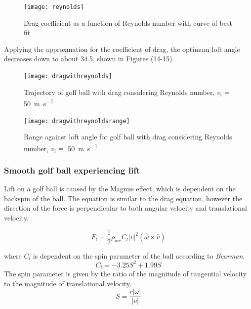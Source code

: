 \documentclass[12pt]{article}
\begin{document}
\begin{figure}[H]
\centering
\caption{Drag coefficient as a function of Reynolds number with curve of best fit}
\texttt{[image: reynolds]}
\end{figure}

Applying the approxmation for the coefficient of drag, the optimum loft angle decreases down to about 34.5\degree, shown in Figures (14-15).
\begin{figure}[H]
\centering
\caption{Trajectory of golf ball with drag considering Reynolds number, $v_i=$ \SI{50}{\metre\per\second}}
\texttt{[image: dragwithreynolds]}
\end{figure}

\begin{figure}[H]
\centering
\caption{Range against loft angle for golf ball with drag considering Reynolds number, $v_i=$ \SI{50}{\metre\per\second}}
\texttt{[image: dragwithreynoldsrange]}
\end{figure}


\subsubsection{Smooth golf ball experiencing lift}
Lift on a golf ball is caused by the Magnus effect, which is dependent on the backspin of the ball. The equation is similar to the drag equation, however the direction of the force is perpendicular to both angular velocity and translational velocity.

\begin{equation} \label{lifteqn}
F_l = \frac{1}{2} \rho_{air} C_{l} |v|^2 (\hat{\omega} \times \hat{v})
\end{equation}

where $C_l$ is dependent on the spin parameter of the ball according to \textit{Bearman}\cite{Bearman1976}.
\begin{equation} \label{clifteqn}
C_l = -3.25 S^2 + 1.99 S
\end{equation}
The spin parameter is given by the ratio of the magnitude of tangential velocity to the magnitude of translational velocity.
\begin{equation} \label{spineqn}
S = \frac{r|\omega|}{|v|}
\end{equation}


{}


\pagebreak

\end{document}
